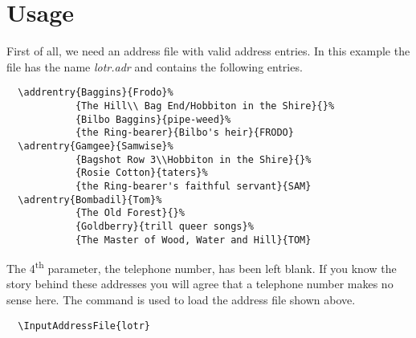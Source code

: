 %
%
%
%
%

\section{Usage}\label{sec:scraddr.usage}

First of all, we need an address file with valid address entries.
In this example the file has the name \emph{lotr.adr} and contains
the following entries.
\begin{lstlisting}
  \addrentry{Baggins}{Frodo}%
            {The Hill\\ Bag End/Hobbiton in the Shire}{}%
            {Bilbo Baggins}{pipe-weed}%
            {the Ring-bearer}{Bilbo's heir}{FRODO}
  \adrentry{Gamgee}{Samwise}%
            {Bagshot Row 3\\Hobbiton in the Shire}{}%
            {Rosie Cotton}{taters}%
            {the Ring-bearer's faithful servant}{SAM}
  \adrentry{Bombadil}{Tom}%
            {The Old Forest}{}%
            {Goldberry}{trill queer songs}%
            {The Master of Wood, Water and Hill}{TOM}
\end{lstlisting}

The 4\textsuperscript{th} parameter, the telephone number, has been left
blank. If you know the story behind these addresses you
will agree that a telephone number makes no sense here.
The command  is used to load
the address file shown above.
\begin{lstlisting}
  \InputAddressFile{lotr}
\end{lstlisting}


